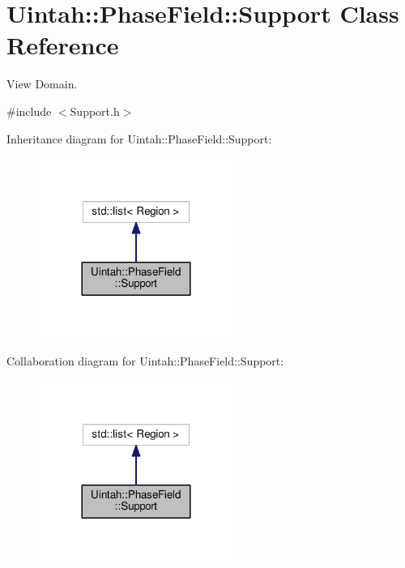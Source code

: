 \hypertarget{classUintah_1_1PhaseField_1_1Support}{}\section{Uintah\+:\+:Phase\+Field\+:\+:Support Class Reference}
\label{classUintah_1_1PhaseField_1_1Support}


View Domain.  




{\ttfamily \#include $<$Support.\+h$>$}



Inheritance diagram for Uintah\+:\+:Phase\+Field\+:\+:Support\+:\nopagebreak
\begin{figure}[H]
\begin{center}
\leavevmode
\includegraphics[width=180pt]{classUintah_1_1PhaseField_1_1Support__inherit__graph}
\end{center}
\end{figure}


Collaboration diagram for Uintah\+:\+:Phase\+Field\+:\+:Support\+:\nopagebreak
\begin{figure}[H]
\begin{center}
\leavevmode
\includegraphics[width=180pt]{classUintah_1_1PhaseField_1_1Support__coll__graph}
\end{center}
\end{figure}
